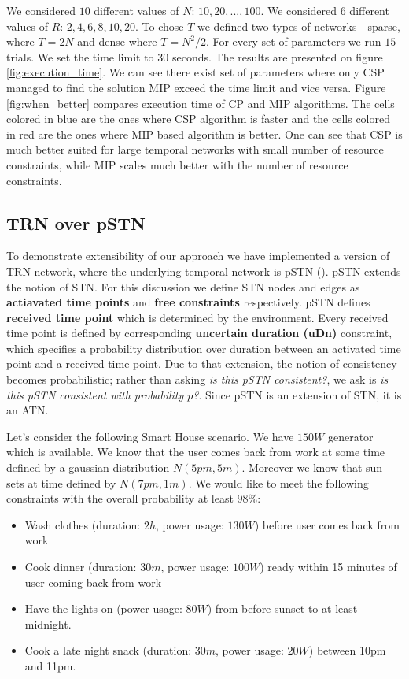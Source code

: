 We considered $10$ different values of $N$: $10, 20, ..., 100$. We considered $6$ different values of $R$: $2, 4, 6, 8, 10, 20$. To chose $T$ we defined two types of networks - sparse, where $T = 2N$ and dense where $T = N^2/2$. For every set of parameters we run $15$ trials. We set the time limit to $30$ seconds. The results are presented on figure \ref{fig:execution_time}. We can see there exist set of parameters where only CSP managed to find the solution MIP exceed the time limit and vice versa. Figure \ref{fig:when_better} compares execution time of CP and MIP algorithms. The cells colored in blue are the ones where CSP algorithm is faster and the cells colored in red are the ones where MIP based algorithm is better. One can see that CSP is much better suited for large temporal networks with small number of resource constraints, while MIP scales much better with the number of resource constraints.




\subsection{TRN over pSTN}
To demonstrate extensibility of our approach we have implemented a version of TRN network, where the underlying temporal network is pSTN (\cite{Fang2014}). pSTN extends the notion of STN. For this discussion we define STN nodes and edges as \textbf{actiavated time points} and \textbf{free constraints} respectively. pSTN defines \textbf{received time point} which is determined by the environment. Every received time point is defined by corresponding \textbf{uncertain duration (uDn)} constraint, which specifies a probability distribution over duration between an activated time point and a received time point. Due to that extension, the notion of consistency becomes probabilistic; rather than asking \textit{is this pSTN consistent?}, we ask is \textit{is this pSTN consistent with probability $p$?}. Since pSTN is an extension of STN, it is an ATN.

Let's consider the following Smart House scenario. We have $150W$ generator which is available. We know that the user comes back from work at some time defined by a gaussian distribution $N(5pm, 5m)$. Moreover we know that sun sets at time defined by $N(7pm, 1m)$. We would like to meet the following constraints with the overall probability at least $98\%$:
\begin{itemize}
\item Wash clothes (duration: $2h$, power usage: $130W$) before user comes back from work
\item Cook dinner (duration: $30m$, power usage: $100W$) ready within 15 minutes of user coming back from work
\item Have the lights on (power usage: $80W$) from before sunset to at least midnight.
\item Cook a late night snack (duration: $30m$, power usage: $20W$) between 10pm and 11pm.
\end{itemize}


